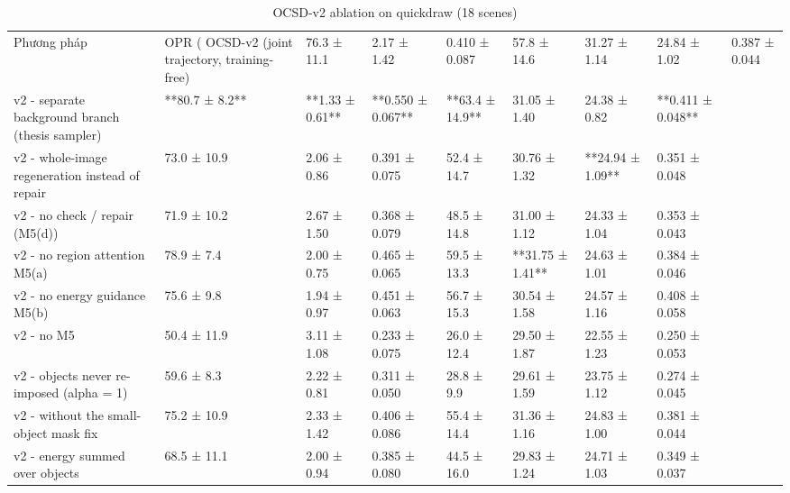 \begin{table}
\caption{OCSD-v2 ablation on quickdraw (18 scenes)}
\begin{tabular}{llllllll}
\toprule
Phương pháp & OPR (%
\midrule
OCSD-v2 (joint trajectory, training-free) & 76.3 ± 11.1 & 2.17 ± 1.42 & 0.410 ± 0.087 & 57.8 ± 14.6 & 31.27 ± 1.14 & 24.84 ± 1.02 & 0.387 ± 0.044 \\
v2 - separate background branch (thesis sampler) & **80.7 ± 8.2** & **1.33 ± 0.61** & **0.550 ± 0.067** & **63.4 ± 14.9** & 31.05 ± 1.40 & 24.38 ± 0.82 & **0.411 ± 0.048** \\
v2 - whole-image regeneration instead of repair & 73.0 ± 10.9 & 2.06 ± 0.86 & 0.391 ± 0.075 & 52.4 ± 14.7 & 30.76 ± 1.32 & **24.94 ± 1.09** & 0.351 ± 0.048 \\
v2 - no check / repair (M5(d)) & 71.9 ± 10.2 & 2.67 ± 1.50 & 0.368 ± 0.079 & 48.5 ± 14.8 & 31.00 ± 1.12 & 24.33 ± 1.04 & 0.353 ± 0.043 \\
v2 - no region attention M5(a) & 78.9 ± 7.4 & 2.00 ± 0.75 & 0.465 ± 0.065 & 59.5 ± 13.3 & **31.75 ± 1.41** & 24.63 ± 1.01 & 0.384 ± 0.046 \\
v2 - no energy guidance M5(b) & 75.6 ± 9.8 & 1.94 ± 0.97 & 0.451 ± 0.063 & 56.7 ± 15.3 & 30.54 ± 1.58 & 24.57 ± 1.16 & 0.408 ± 0.058 \\
v2 - no M5 & 50.4 ± 11.9 & 3.11 ± 1.08 & 0.233 ± 0.075 & 26.0 ± 12.4 & 29.50 ± 1.87 & 22.55 ± 1.23 & 0.250 ± 0.053 \\
v2 - objects never re-imposed (alpha = 1) & 59.6 ± 8.3 & 2.22 ± 0.81 & 0.311 ± 0.050 & 28.8 ± 9.9 & 29.61 ± 1.59 & 23.75 ± 1.12 & 0.274 ± 0.045 \\
v2 - without the small-object mask fix & 75.2 ± 10.9 & 2.33 ± 1.42 & 0.406 ± 0.086 & 55.4 ± 14.4 & 31.36 ± 1.16 & 24.83 ± 1.00 & 0.381 ± 0.044 \\
v2 - energy summed over objects & 68.5 ± 11.1 & 2.00 ± 0.94 & 0.385 ± 0.080 & 44.5 ± 16.0 & 29.83 ± 1.24 & 24.71 ± 1.03 & 0.349 ± 0.037 \\
\bottomrule
\end{tabular}
\end{table}
